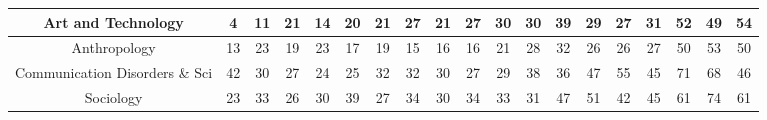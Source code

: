 \documentclass[10]{article}
\begin{document}
\begin{landscape}
\begin{longtable}[c]{|ccccccccccccccccccc|}
	\multicolumn{1}{|c|}{Art and Technology}                         & \multicolumn{1}{c|}{4}          & \multicolumn{1}{c|}{11}         & \multicolumn{1}{c|}{21}         & \multicolumn{1}{c|}{14}         & \multicolumn{1}{c|}{20}         & \multicolumn{1}{c|}{21}         & \multicolumn{1}{c|}{27}         & \multicolumn{1}{c|}{21}         & \multicolumn{1}{c|}{27}         & \multicolumn{1}{c|}{30}         & \multicolumn{1}{c|}{30}         & \multicolumn{1}{c|}{39}         & \multicolumn{1}{c|}{29}         & \multicolumn{1}{c|}{27}         & \multicolumn{1}{c|}{31}         & \multicolumn{1}{c|}{52}         & \multicolumn{1}{c|}{49}         & 54         \\ \hline
	\multicolumn{1}{|c|}{Anthropology}                               & \multicolumn{1}{c|}{13}         & \multicolumn{1}{c|}{23}         & \multicolumn{1}{c|}{19}         & \multicolumn{1}{c|}{23}         & \multicolumn{1}{c|}{17}         & \multicolumn{1}{c|}{19}         & \multicolumn{1}{c|}{15}         & \multicolumn{1}{c|}{16}         & \multicolumn{1}{c|}{16}         & \multicolumn{1}{c|}{21}         & \multicolumn{1}{c|}{28}         & \multicolumn{1}{c|}{32}         & \multicolumn{1}{c|}{26}         & \multicolumn{1}{c|}{26}         & \multicolumn{1}{c|}{27}         & \multicolumn{1}{c|}{50}         & \multicolumn{1}{c|}{53}         & 50         \\ \hline
	\multicolumn{1}{|c|}{Communication Disorders \& Sci}             & \multicolumn{1}{c|}{42}         & \multicolumn{1}{c|}{30}         & \multicolumn{1}{c|}{27}         & \multicolumn{1}{c|}{24}         & \multicolumn{1}{c|}{25}         & \multicolumn{1}{c|}{32}         & \multicolumn{1}{c|}{32}         & \multicolumn{1}{c|}{30}         & \multicolumn{1}{c|}{27}         & \multicolumn{1}{c|}{29}         & \multicolumn{1}{c|}{38}         & \multicolumn{1}{c|}{36}         & \multicolumn{1}{c|}{47}         & \multicolumn{1}{c|}{55}         & \multicolumn{1}{c|}{45}         & \multicolumn{1}{c|}{71}         & \multicolumn{1}{c|}{68}         & 46         \\ \hline
	\multicolumn{1}{|c|}{Sociology}                                  & \multicolumn{1}{c|}{23}         & \multicolumn{1}{c|}{33}         & \multicolumn{1}{c|}{26}         & \multicolumn{1}{c|}{30}         & \multicolumn{1}{c|}{39}         & \multicolumn{1}{c|}{27}         & \multicolumn{1}{c|}{34}         & \multicolumn{1}{c|}{30}         & \multicolumn{1}{c|}{34}         & \multicolumn{1}{c|}{33}         & \multicolumn{1}{c|}{31}         & \multicolumn{1}{c|}{47}         & \multicolumn{1}{c|}{51}         & \multicolumn{1}{c|}{42}         & \multicolumn{1}{c|}{45}         & \multicolumn{1}{c|}{61}         & \multicolumn{1}{c|}{74}         & 61         \\ \hline

\end{longtable}
\end{landscape}
\end{document}
